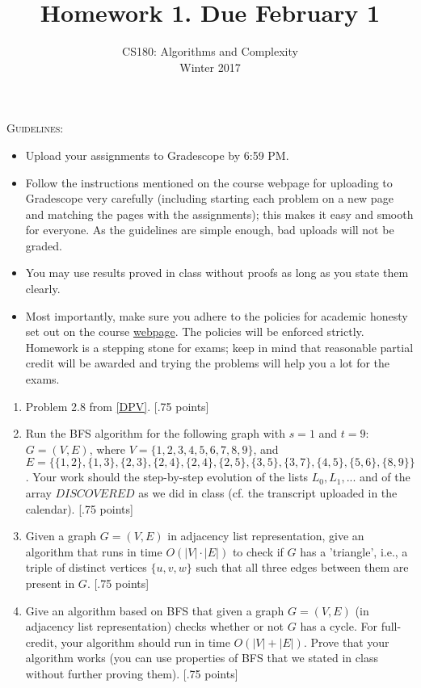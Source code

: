 \documentclass[11pt]{article}
\title{\bf{Homework 1. Due February 1}}
\author{ CS180: Algorithms and Complexity\\Winter 2017}
\date{}
\begin{document}
\maketitle
\begin{mdframed}
\textsc{Guidelines}:
\begin{itemize}
\item Upload your assignments to Gradescope by 6:59 PM. 
\item Follow the instructions mentioned on the course webpage for uploading to Gradescope very carefully (including starting each problem on a new page and matching the pages with the assignments); this makes it easy and smooth for everyone. As the guidelines are simple enough, bad uploads will not be graded. 
\item You may use results proved in class without proofs as long as you state them clearly.
\item Most importantly, make sure you adhere to the policies for academic honesty set out on the course \href{http://cs180.raghumeka.org}{webpage}. The policies will be enforced strictly. Homework is a stepping stone for exams; keep in mind that reasonable partial credit will be awarded and trying the problems will help you a lot for the exams.
\end{itemize}
\end{mdframed}


\begin{enumerate}
\item Problem 2.8 from \href{https://people.eecs.berkeley.edu/~vazirani/algorithms/chap2.pdf}{[DPV]}. [.75 points]

\item Run the BFS algorithm for the following graph with $s = 1$ and $t = 9$: $G = (V,E)$, where $V = \{1,2,3,4,5,6,7,8,9\}$, and $E = \{\{1,2\}, \{1,3\}, \{2,3\}, \{2,4\},\{2,4\},\{2,5\},\{3,5\},\{3,7\},\{4,5\},\{5,6\}, \{8,9\}\}$. Your work should the step-by-step evolution of the lists $L_0, L_1,...$ and of the array $DISCOVERED$ as we did in class (cf. the transcript uploaded in the calendar). [.75 points]

\item Given a graph $G = (V,E)$ in adjacency list representation, give an algorithm that runs in time $O(|V| \cdot |E|)$ to check if $G$ has a 'triangle', i.e., a triple of distinct vertices $\{u,v,w\}$ such that all three edges between them are present in $G$. [.75 points]

\item Give an algorithm based on BFS that given a graph $G = (V,E)$ (in adjacency list representation) checks whether or not $G$ has a cycle. For full-credit, your algorithm should run in time $O(|V| + |E|)$. Prove that your algorithm works (you can use properties of BFS that we stated in class without further proving them). [.75 points]

\end{enumerate}
\end{document}
